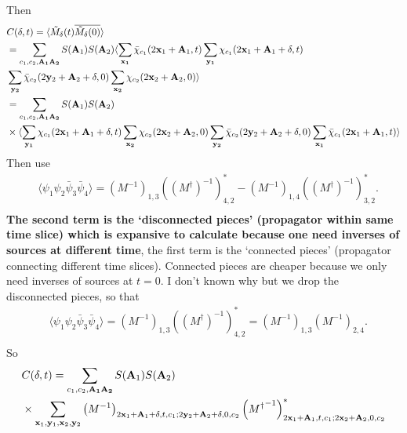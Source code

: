 Then
\begin{equation}
\begin{split}
&C(\delta,t)=\langle \tilde{M}_{\delta}(t) \overline{\tilde{M} _{\delta}(0)}\rangle \\
&= \sum _{c_1,c_2,\bf A _1 A_2}S({\bf A}_1)S({\bf A}_2)\langle \sum _{\bf x _1}\bar{\chi}_{c_1}(2{\bf x}_1 + {\bf A}_1,t)\sum _{\bf y _1}\chi_{c_1}(2{\bf x}_1+{\bf A}_1+\delta,t)\\
& \sum _{\bf y_2}\bar{\chi} _{c_2} (2{\bf y}_2+{\bf A}_2+\delta,0) \sum _{\bf x _2} \chi_{c_2}(2{\bf x}_2+{\bf A}_2,0)\rangle\\
&=\sum _{c_1,c_2,\bf A _1 A_2}S({\bf A}_1)S({\bf A}_2)\\
&\times \langle \sum _{\bf y _1}\chi_{c_1}(2{\bf x}_1+{\bf A}_1+\delta,t)  \sum _{\bf x _2} \chi_{c_2}(2{\bf x}_2+{\bf A}_2,0)\sum _{\bf y_2}\bar{\chi} _{c_2} (2{\bf y}_2+{\bf A}_2+\delta,0)\sum _{\bf x _1}\bar{\chi}_{c_1}(2{\bf x}_1 + {\bf A}_1,t)\rangle\\
\end{split}
\end{equation}
Then use
\begin{equation}
\begin{split}
&\langle \psi _1\psi_2 \bar{\psi} _3 \bar{\psi}_4\rangle = \left(M^{-1}\right)_{1,3}\left((M^{\dagger})^{-1}\right)_{4,2}^*- \left(M^{-1}\right)_{1,4}\left((M^{\dagger})^{-1}\right)_{3,2}^*.\\
\end{split}
\end{equation}
\textcolor[rgb]{1,0,0}{\textbf{The second term is the `disconnected pieces' (propagator within same time slice) which is expansive to calculate because one need inverses of sources at different time}, the first term is the `connected pieces' (propagator connecting different time slices). Connected pieces are cheaper because we only need inverses of sources at $t=0$.} I don't known why but we drop the disconnected pieces, so that
\begin{equation}
\begin{split}
&\langle \psi _1\psi_2 \bar{\psi} _3 \bar{\psi}_4\rangle = \left(M^{-1}\right)_{1,3}\left((M^{\dagger})^{-1}\right)_{4,2}^*= \left(M^{-1}\right)_{1,3}\left(M^{-1}\right)_{2,4}.\\
\end{split}
\end{equation}
So
\begin{equation}
\begin{split}
&C(\delta,t)=\sum _{c_1,c_2,\bf A _1 A_2}S({\bf A}_1)S({\bf A}_2)\\
&\times \sum _{{\bf x}_1,{\bf y}_1,{\bf x}_2,{\bf y}_2}\left(M^{-1}\right)_{2{\bf x}_1+{\bf A}_1+\delta,t,c_1;2{\bf y}_2+{\bf A}_2+\delta,0,c_2}\left({M^{\dagger}}^{-1}\right)^*_{2{\bf x}_1 + {\bf A}_1,t,c_1;2{\bf x}_2+{\bf A}_2,0,c_2}\\
\end{split}
\end{equation}
